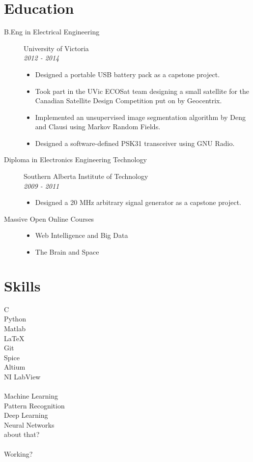 \documentclass[a4paper, 10pt]{article}
\begin{document}
\section{Education}
  \begin{description}
    \item[B.Eng in Electrical Engineering] \hfill University of Victoria\\
    \emph{2012 - 2014}
      \begin{itemize}
        \item Designed a portable USB battery pack as a capstone project.
        \item Took part in the UVic ECOSat team designing a small satellite for the Canadian Satellite Design Competition put on by Geocentrix.
        \item Implemented an unsupervised image segmentation algorithm by Deng and Clausi using Markov Random Fields.
        \item Designed a software-defined PSK31 transceiver using GNU Radio. 
      \end{itemize}
    \item[Diploma in Electronics Engineering Technology] \hfill Southern Alberta Institute of Technology\\
    \emph{2009 - 2011}
      \begin{itemize}
        \item Designed a 20 MHz arbitrary signal generator as a capstone project.
      \end{itemize}
    \item[Massive Open Online Courses] \hfill
      \begin{itemize}
        \item Web Intelligence and Big Data
        \item The Brain and Space
      \end{itemize}
  \end{description}

\section{Skills}
  \begin{multicols}{5}
    C\\Python\\Matlab\\\LaTeX\\Git
    \columnbreak\\
    Spice\\Altium\\NI LabView\\
    \columnbreak\\
    Machine Learning\\Pattern Recognition\\Deep Learning\\Neural Networks
    \columnbreak\\
    about that?\\
    \columnbreak\\
    Working?\\
    \columnbreak
  \end{multicols}
\end{document}
